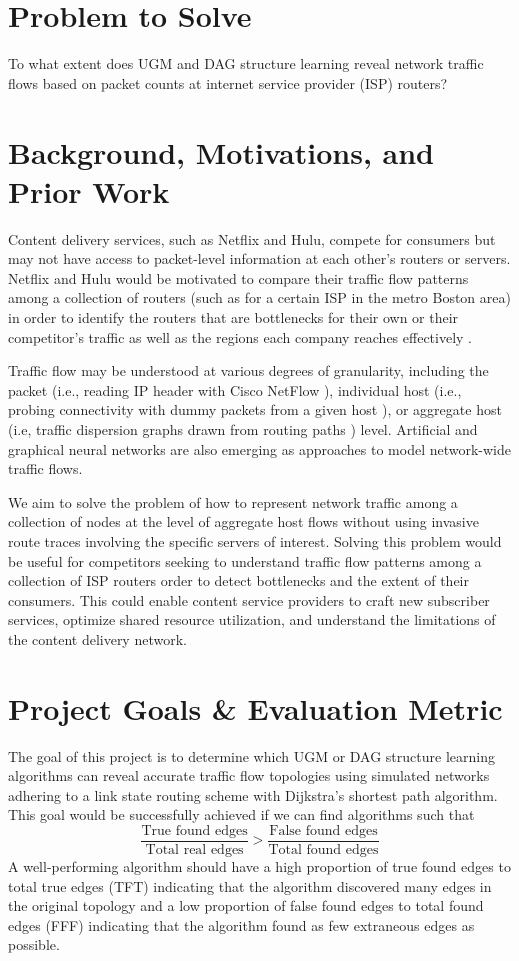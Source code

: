\documentclass[conference]{IEEEtran}
\begin{document}
\section{Problem to Solve}

To what extent does UGM and DAG structure learning reveal network traffic flows based on packet counts at internet service provider (ISP) routers?

\section{Background, Motivations, and Prior Work}

Content delivery services, such as Netflix and Hulu, compete for consumers but may not have access to packet-level information at each other's routers or servers. Netflix and Hulu would be motivated to compare their traffic flow patterns among a collection of routers (such as for a certain ISP in the metro Boston area) in order to identify the routers that are bottlenecks for their own or their competitor's traffic as well as the regions each company reaches effectively \cite{b1}.

Traffic flow may be understood at various degrees of granularity, including the packet (i.e., reading IP header with Cisco NetFlow \cite{b2}), individual host (i.e., probing connectivity with dummy packets from a given host \cite{b3}), or aggregate host (i.e, traffic dispersion graphs drawn from routing paths \cite{b1}) level. Artificial \cite{b4} and graphical \cite{b5} neural networks are also emerging as approaches to model network-wide traffic flows.

We aim to solve the problem of how to represent network traffic among a collection of nodes at the level of aggregate host flows without using invasive route traces involving the specific servers of interest. Solving this problem would be useful for competitors seeking to understand traffic flow patterns among a collection of ISP routers order to detect bottlenecks and the extent of their consumers. This could enable content service providers to craft new subscriber services, optimize shared resource utilization, and understand the limitations of the content delivery network.

\section{Project Goals \& Evaluation Metric}

The goal of this project is to determine which UGM or DAG structure learning algorithms can reveal accurate traffic flow topologies using simulated networks adhering to a link state routing scheme with Dijkstra's shortest path algorithm. This goal would be successfully achieved if we can find algorithms such that
\[
\frac{\text{True found edges}}{\text{Total real edges}} > \frac{\text{False found edges}}{\text{Total found edges}}
\]
A well-performing algorithm should have a high proportion of true found edges to total true edges (TFT) indicating that the algorithm discovered many edges in the original topology and a low proportion of false found edges to total found edges (FFF) indicating that the algorithm found as few extraneous edges as possible.
\end{document}
